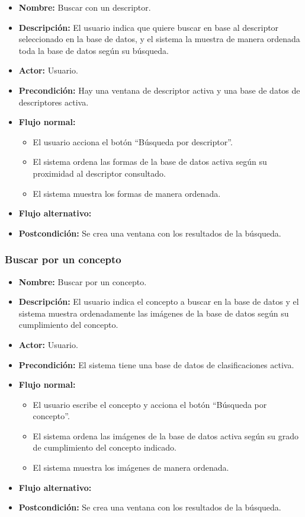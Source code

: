 \begin{itemize}
\item \textbf{Nombre: }Buscar con un descriptor.
\item \textbf{Descripción: } El usuario indica que quiere buscar en base al descriptor seleccionado en la base de datos, y el sistema la muestra de manera ordenada toda la base de datos según su búsqueda.
\item \textbf{Actor: }Usuario.
\item \textbf{Precondición: }Hay una ventana de descriptor activa y una base de datos de descriptores activa.
\item \textbf{Flujo normal: }
\begin{itemize}
\item El usuario acciona el botón ``Búsqueda por descriptor''.
\item El sistema ordena las formas de la base de datos activa según su proximidad al descriptor consultado.
\item El sistema muestra los formas de manera ordenada.
\end{itemize}
\item \textbf{Flujo alternativo:}
\item \textbf{Postcondición: }Se crea una ventana con los resultados de la búsqueda.
\end{itemize}

\newpage

\subsubsection{Buscar por un concepto}

\begin{itemize}
\item \textbf{Nombre: }Buscar por un concepto.
\item \textbf{Descripción: }El usuario indica el concepto a buscar en la base de datos y el sistema muestra ordenadamente las imágenes de la base de datos según su cumplimiento del concepto.
\item \textbf{Actor: }Usuario.
\item \textbf{Precondición: }El sistema tiene una base de datos de clasificaciones activa.
\item \textbf{Flujo normal: }
\begin{itemize}
\item El usuario escribe el concepto y acciona el botón ``Búsqueda por concepto''.
\item El sistema ordena las imágenes de la base de datos activa según su grado de cumplimiento del concepto indicado.
\item El sistema muestra los imágenes de manera ordenada.
\end{itemize}
\item \textbf{Flujo alternativo:}
\item \textbf{Postcondición: }Se crea una ventana con los resultados de la búsqueda.
\end{itemize}

